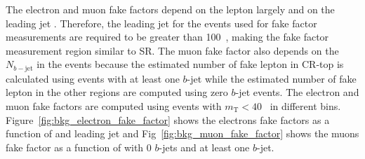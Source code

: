 \begin{table}[htbp]
    \caption{The ID and anti-ID selection criteria for electrons and muons.}
    \label{tab:bkg_ID_anti_ID_selection_criteria}
\end{table}

The electron and muon fake factors depend on the lepton \pt largely and on the leading jet \pt.
Therefore, the leading jet \pt for the events used for fake factor measurements are required to be greater than 100~{\GeV}, making the fake factor measurement region similar to SR.
The muon fake factor also depends on the $N_{b-\mathrm{jet}}$ in the events because the estimated number of fake lepton in CR-top is calculated using events with at least one $b$-jet while the estimated number of fake lepton in the other regions are computed using zero $b$-jet events.
The electron and muon fake factors are computed using events with $m_\mathrm{T} < 40$~{\GeV} in different \pt bins.
Figure~\ref{fig:bkg_electron_fake_factor} shows the electrons fake factors as a function of \pt and leading jet \pt and Fig~\ref{fig:bkg_muon_fake_factor} shows the muons fake factor as a function of \pt with 0 $b$-jets and at least one $b$-jet.

